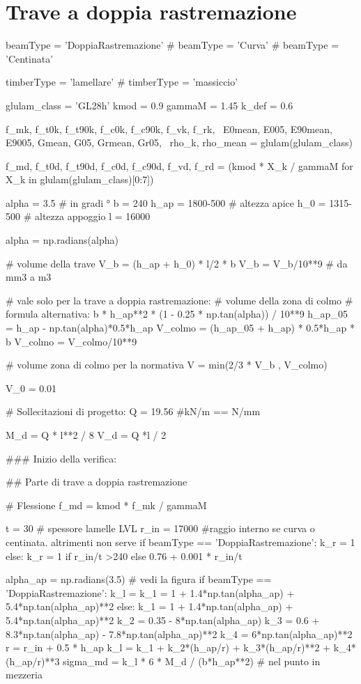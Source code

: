 \section{Trave a doppia rastremazione}
\begin{pycode}[TraveDoppiaRastremazione]
beamType = 'DoppiaRastremazione'
# beamType = 'Curva'
# beamType = 'Centinata'

timberType = 'lamellare'
# timberType = 'massiccio'

glulam_class = 'GL28h'
kmod = 0.9
gammaM = 1.45
k_def = 0.6

f_mk, f_t0k, f_t90k, f_c0k, f_c90k, f_vk, f_rk, \
E0mean, E005, E90mean, E9005, Gmean, G05, Grmean, Gr05, \
rho_k, rho_mean = glulam(glulam_class)

f_md, f_t0d, f_t90d, f_c0d, f_c90d, f_vd, f_rd = (kmod * X_k / gammaM for X_k in glulam(glulam_class)[0:7])

alpha = 3.5 # in gradi °
b = 240
h_ap = 1800-500 # altezza apice
h_0 = 1315-500 # altezza appoggio
l = 16000 

alpha = np.radians(alpha)

# volume della trave 
V_b = (h_ap + h_0) * l/2 * b 
V_b = V_b/10**9 # da mm3 a m3

# vale solo per la trave a doppia rastremazione:
# volume della zona di colmo
# formula alternativa: b * h_ap**2 * (1 - 0.25 * np.tan(alpha)) / 10**9
h_ap_05 = h_ap - np.tan(alpha)*0.5*h_ap
V_colmo =  (h_ap_05 + h_ap) * 0.5*h_ap * b
V_colmo = V_colmo/10**9

# volume zona di colmo per la normativa
V = min(2/3 * V_b , V_colmo)

V_0 = 0.01

# Sollecitazioni di progetto:
Q = 19.56 #kN/m == N/mm

M_d = Q * l**2 / 8
V_d = Q *l / 2

### Inizio della verifica:

## Parte di trave a doppia rastremazione

# Flessione
f_md = kmod * f_mk / gammaM

t = 30 # spessore lamelle LVL
r_in = 17000 #raggio interno se curva o centinata. altrimenti non serve
if beamType == 'DoppiaRastremazione':
    k_r = 1
else:
    k_r = 1 if r_in/t >240 else 0.76 + 0.001 * r_in/t

alpha_ap = np.radians(3.5) # vedi la figura
if beamType == 'DoppiaRastremazione':
    k_l = k_1 = 1 + 1.4*np.tan(alpha_ap) + 5.4*np.tan(alpha_ap)**2
else:
    k_1 = 1 + 1.4*np.tan(alpha_ap) + 5.4*np.tan(alpha_ap)**2
    k_2 = 0.35 - 8*np.tan(alpha_ap)
    k_3 = 0.6 + 8.3*np.tan(alpha_ap) - 7.8*np.tan(alpha_ap)**2
    k_4 = 6*np.tan(alpha_ap)**2
    r = r_in + 0.5 * h_ap
    k_l = k_1 + k_2*(h_ap/r) + k_3*(h_ap/r)**2 + k_4*(h_ap/r)**3
sigma_md = k_l * 6 * M_d / (b*h_ap**2) # nel punto in mezzeria


\end{pycode}
